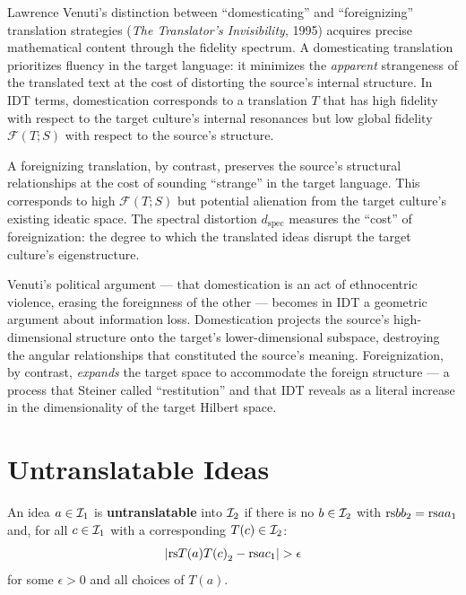 \begin{interpretation}
\label{interp:ch18:venuti_domestication}
Lawrence Venuti's distinction between ``domesticating'' and ``foreignizing''
translation strategies (\textit{The Translator's Invisibility}, 1995)
acquires precise mathematical content through the fidelity spectrum.
A domesticating translation prioritizes fluency in the target language:
it minimizes the \emph{apparent} strangeness of the translated text at
the cost of distorting the source's internal structure.  In IDT terms,
domestication corresponds to a translation $T$ that has high fidelity with
respect to the target culture's internal resonances but low global fidelity
$\mathcal{F}(T; S)$ with respect to the source's structure.

A foreignizing translation, by contrast, preserves the source's structural
relationships at the cost of sounding ``strange'' in the target language.
This corresponds to high $\mathcal{F}(T; S)$ but potential alienation from
the target culture's existing ideatic space.  The spectral distortion
$d_{\text{spec}}$ measures the ``cost'' of foreignization: the degree to
which the translated ideas disrupt the target culture's eigenstructure.

Venuti's political argument --- that domestication is an act of ethnocentric
violence, erasing the foreignness of the other --- becomes in IDT a
geometric argument about information loss.  Domestication projects the
source's high-dimensional structure onto the target's lower-dimensional
subspace, destroying the angular relationships that constituted the
source's meaning.  Foreignization, by contrast, \emph{expands} the
target space to accommodate the foreign structure --- a process that
Steiner called ``restitution'' and that IDT reveals as a literal increase
in the dimensionality of the target Hilbert space.
\end{interpretation}

\section{Untranslatable Ideas}

\begin{definition}[Untranslatable]
\label{def:untranslatable}
An idea $a \in \mathcal{I}_1$ is \textbf{untranslatable} into $\mathcal{I}_2$ if there is no
$b \in \mathcal{I}_2$ with $\mathrm{rs}{b}{b}_2 = \mathrm{rs}{a}{a}_1$ and, for all $c \in \mathcal{I}_1$
with a corresponding $T(c) \in \mathcal{I}_2$:
\[
  |\mathrm{rs}{T(a)}{T(c)}_2 - \mathrm{rs}{a}{c}_1| > \epsilon
\]
for some $\epsilon > 0$ and all choices of $T(a)$.
\end{definition}

